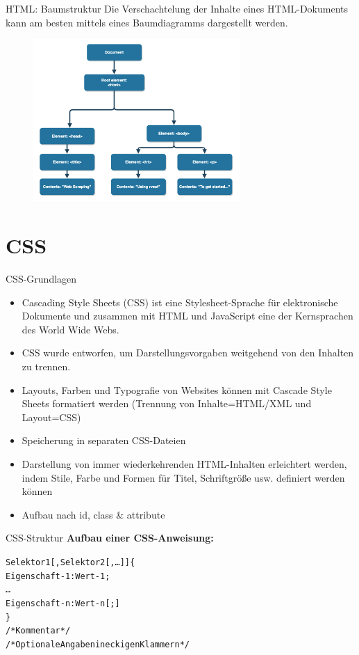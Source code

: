 \documentclass[xcolor=dvipsnames]{beamer}\usepackage[]{graphicx}\usepackage[]{color}
\makeatletter
\newenvironment{kframe}{%
 \def\at@end@of@kframe{}%
 \ifinner\ifhmode%
  \def\at@end@of@kframe{\end{minipage}}%
  \begin{minipage}{\columnwidth}%
 \fi\fi%
 \def\FrameCommand##1{\hskip\@totalleftmargin \hskip-\fboxsep
 \colorbox{shadecolor}{##1}\hskip-\fboxsep
     \hskip-\linewidth \hskip-\@totalleftmargin \hskip\columnwidth}%
 \MakeFramed {\advance\hsize-\width
   \@totalleftmargin\z@ \linewidth\hsize
   \@setminipage}}%
 {\par\unskip\endMakeFramed%
 \at@end@of@kframe}
\makeatother
\begin{document}
\begin{frame}{HTML: Baumstruktur}
Die Verschachtelung der Inhalte eines HTML-Dokuments kann am besten mittels eines Baumdiagramms dargestellt werden. 
\begin{figure}
  	\centering
  	\includegraphics[width=0.7\textwidth]{figure/HTMLtree.png}
  \end{figure}
\end{frame}


\section{CSS}

\begin{frame}{CSS-Grundlagen}
\begin{itemize}
\item Cascading Style Sheets (CSS) ist eine Stylesheet-Sprache für elektronische Dokumente und zusammen mit HTML und JavaScript eine der Kernsprachen des World Wide Webs.
\item CSS wurde entworfen, um Darstellungsvorgaben weitgehend von den Inhalten zu trennen.
\item Layouts, Farben und Typografie von Websites können mit Cascade Style Sheets formatiert
werden (Trennung von Inhalte=HTML/XML und Layout=CSS)
\item Speicherung in separaten CSS-Dateien
\item Darstellung von immer wiederkehrenden HTML-Inhalten erleichtert werden, indem Stile, Farbe und Formen für Titel, Schriftgröße usw. definiert werden können
\item Aufbau nach id, class \& attribute
\end{itemize}
\end{frame}


\begin{frame}[fragile]{CSS-Struktur}
\textbf{Aufbau einer CSS-Anweisung:}
\begin{kframe}
\begin{alltt}
Selektor1 [, Selektor2 [, …] ] \{
    Eigenschaft-1: Wert-1;
    …
    Eigenschaft-n: Wert-n[;]
\}
/* Kommentar */
/* Optionale Angaben in eckigen Klammern */
\end{alltt}
\end{kframe}
\end{frame}
\end{document}
